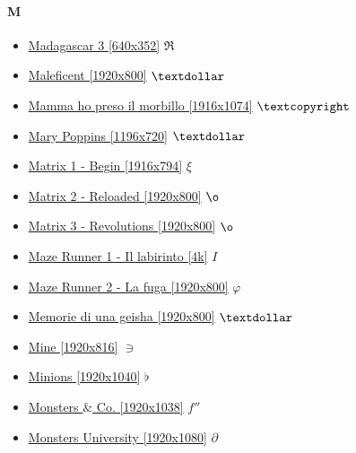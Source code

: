 	\paragraph{M} \hypertarget{FIM}{}
		\begin{itemize}
			
			\item \href{https://mega.nz/#!aX5zBQqA!uy0t-4rVjNSdimcqK7d-6jOkELHG-FWoCwwFhaf9d4A} {Madagascar 3 [640x352]}  $\Re$ \\ 
			\item \href{https://mega.nz/#!P6QUGKxS!l0dvGzb3wpvNdJm0r1z8xma8Le5ZbgUXrv9wyLzTGp8} {Maleficent [1920x800]}  $\textdollar$ \\ 
			\item \href{https://mega.nz/#!2Kx0xAyS!gB18K-Hbbud0S8dj-AtoJ-RiVV8t12v3CPuZ4bzkl7w} {Mamma ho preso il morbillo [1916x1074]}  $\textcopyright$ \\ 
			\item \href{https://mega.nz/#!TjxnEChZ!It7kKbp7KoQXkTgZT6KZmeXC-hQ9npk1dWSYjkBE_8U} {Mary Poppins [1196x720]}  $\textdollar$ \\ 
			\item \href{https://mega.nz/#!H8w0GCZa!ldO8G6ob7razi8Qb1yf2iQ3DzbeK_5MHjtzYFEW9UgI} {Matrix 1 - Begin [1916x794]}  $\xi$ \\ 
			\item \href{https://mega.nz/#!AwoCmASK!Dhk7ljx-BBNixYclqjGaVev72aahX8delKTMWGTyh24} {Matrix 2 - Reloaded [1920x800]}  $\o$ \\ 		
			\item \href{https://mega.nz/#!4t4gQS6Y!efiqwjM3uDfLPoH8YrT5nCkoU1J3fdyfiyVtE81dUxg} {Matrix 3 - Revolutions  [1920x800]}  $\o$ \\
			\item \href{https://mega.nz/#!jt1Tybpb!TypkpF2vhv5Zd76ACmd_QgC87mn0z-tBV3hIifdAIuw} {Maze Runner 1 - Il labirinto  [4k]}  $I$ \\
			\item \href{https://mega.nz/#!YWZjGA5C!XAuCjFg0AyHb1uWFM3k7mzEgBpLJTLVwJ_HCo_2p7jY} {Maze Runner 2 - La fuga  [1920x800]}  $\varphi$ \\
			\item \href{https://mega.nz/#!Wi4jAIBT!SCyRTPmKjucBwcf-uTb7MxleNfGLNBdJyvV0gNPvvg8} {Memorie di una geisha [1920x800]}  $\textdollar$ \\
			\item \href{https://mega.nz/#!faxBnbLL!Vx8bCD7zuAOPxfBMMCY2U3VjaowtZ0_nTIK7ppmKGl8} {Mine [1920x816]}  $\ni$ \\
			\item \href{https://mega.nz/#!sjpBUQSC!yBPspVPkNH9qrFBzca-hTr2E_jSrDpvjMsAliui00Mw} {Minions  [1920x1040]}  $\flat$ \\
			\item \href{https://mega.nz/#!qK4CXZTL!Z-AiZn4GuFddusYuHuMnclbX2ZwMG686PvCVoghA0iY} { Monsters $\&$ Co. [1920x1038]}  $f''$ \\
			\item \href{https://mega.nz/#!uToGxbyD!h6TQP45ABoEk46GvjViUIUe4Uqku3thM-FxyqhClkV0} {Monsters University [1920x1080]}  $\partial$ \\
			
		\end{itemize}	
